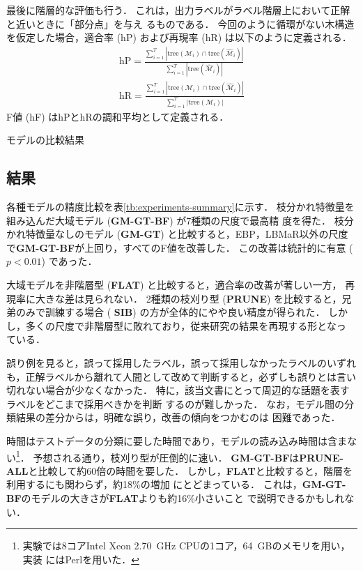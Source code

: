 \documentclass[japanese]{jnlp_1.4}
\begin{document}
最後に階層的な評価も行う\cite{Kiritchenko2005}．
これは，出力ラベルがラベル階層上において正解と近いときに「部分点」を与え
るものである．
今回のように循環がない木構造を仮定した場合，適合率 (hP) および再現率
(hR) は以下のように定義される．
\begin{gather*}
 \mathrm{hP} =
\frac{\sum_{i=1}^T |\mathrm{tree}(\mathcal{M}_i) \cap \mathrm{tree}(\hat{\mathcal{M}}_i)|}
  {\sum_{i=1}^T |\mathrm{tree}(\hat{\mathcal{M}}_i)|} \\
   \mathrm{hR} =
\frac{\sum_{i=1}^T |\mathrm{tree}(\mathcal{M}_i) \cap \mathrm{tree}(\hat{\mathcal{M}}_i)|}
  {\sum_{i=1}^T |\mathrm{tree}(\mathcal{M}_i)|}
\end{gather*}
F値 (hF) はhPとhRの調和平均として定義される．


\begin{table}[b]
  \caption{モデルの比較結果}
  \label{tb:experiments-summary}

\end{table}


\subsection{結果}

各種モデルの精度比較を表\ref{tb:experiments-summary}に示す．
枝分かれ特徴量を組み込んだ大域モデル ({\bf GM-GT-BF}) が7種類の尺度で最高精
度を得た．
枝分かれ特徴量なしのモデル ({\bf GM-GT}) と比較すると，EBP，LBMaR以外の尺度
で{\bf GM-GT-BF}が上回り，すべてのF値を改善した．
この改善は統計的に有意 ($p < 0.01$) であった．

大域モデルを非階層型 ({\bf FLAT}) と比較すると，適合率の改善が著しい一方，
再現率に大きな差は見られない．
2種類の枝刈り型 ({\bf PRUNE}) を比較すると，兄弟のみで訓練する場合 ({\bf
SIB}) の方が全体的にやや良い精度が得られた．
しかし，多くの尺度で非階層型に敗れており，従来研究の結果を再現する形となっ
ている．

誤り例を見ると，誤って採用したラベル，誤って採用しなかったラベルのいずれ
も，正解ラベルから離れて人間として改めて判断すると，必ずしも誤りとは言い
切れない場合が少なくなかった．
特に，該当文書にとって周辺的な話題を表すラベルをどこまで採用べきかを判断
するのが難しかった．
なお，モデル間の分類結果の差分からは，明確な誤り，改善の傾向をつかむのは
困難であった．

時間はテストデータの分類に要した時間であり，モデルの読み込み時間は含まな
い\footnote{
実験では8コアIntel Xeon 2.70~GHz CPUの1コア，64~GBのメモリを用い，実装
にはPerlを用いた．}．
予想される通り，枝刈り型が圧倒的に速い．
{\bf GM-GT-BF}は{\bf PRUNE-ALL}と比較して約60倍の時間を要した．
しかし，{\bf FLAT}と比較すると，階層を利用するにも関わらず，約18\%の増加
にとどまっている．
これは，{\bf GM-GT-BF}のモデルの大きさが{\bf FLAT}よりも約16\%小さいこと
で説明できるかもしれない．
\end{document}
